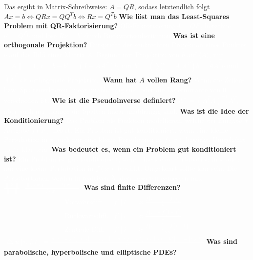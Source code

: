\documentclass{beamer}
\newcommand{\qr}{QR-Faktorisierung\xspace}
\begin{document}
{{{		Das ergibt in Matrix-Schreibweise: $A=QR$, sodass letztendlich folgt $Ax=b\Leftrightarrow QRx=QQ^Tb \Leftrightarrow Rx=Q^Tb$
} }
{\textbf{ Wie löst man das Least-Squares Problem mit \qr?\newline} \textcolor<1>{white}{
		\qr $A=QR$, berechne $b'=Q^Tb$ und löse $Rx=b'$ durch Rückwärtssubstitution
} }
{\textbf{ Was ist eine orthogonale Projektion?\newline} \textcolor<1>{white}{
		Entspricht der senkrechten Projektion eines Punktes $b$ auf das Bild einer Matrix $A$.
		Beginne mit Projektion von $b$ auf $\langle A\rangle$, mit $\|A\|=1$,
		$r=b-b'=(I-AA^T)b$, mit $b'=\left(\sum_{i=1}^{k}A_iA_i^T\right)b=\hat{A}\hat{A}^Tb$ und $\hat{A}\hat{A}^T$ als orthogonale Projektion.
} }
{\textbf{ Wann hat $A$ vollen Rang?\newline} \textcolor<1>{white}{
		Wenn die Zeilen- bzw. Spaltenvektoren linear unabhängig sind oder die Determinante von 0 verschieden ist.
} }
{\textbf{ Wie ist die Pseudoinverse definiert?\newline} \textcolor<1>{white}{
		$A^+=(A^TA)^{-1}A^T$, aber auch nur solange die Spalten linear unabhängig sind.
} }
{\textbf{ Was ist die Idee der Konditionierung?\newline} \textcolor<1>{white}{
		Das Problem als Funktion modellieren, welche bei Eingabe $x$ Ausgabe $f(x)$ liefert. Ein Problem ist gut konditioniert, wenn eine kleine Pertubation in $x$ auch nur eine kleine Pertubation in $f(x)$ bewirkt. Umgekehrt sollte klar sein. 
} }
{\textbf{ Was bedeutet es, wenn ein Problem gut konditioniert ist?\newline} \textcolor<1>{white}{
		Ein Problem ist gut konditioniert, wenn eine kleine Pertubation in $x$ auch nur eine kleine Pertubation in $f(x)$ bewirkt. Umgekehrt sollte klar sein. Die Pertubartionen werden in realtiven Änderungsraten gemessen mit:$\frac{\|\delta x\|}{\|x\|}, \; \frac{\|f(x+\delta x)-f(x)\|}{\|f(x)\|}$.
} }
{\textbf{ Was sind finite Differenzen?\newline} \textcolor<1>{white}{
		\begin{align*}
			\text{Vorwärtsdiff.} &f'[i]&\approx\frac{f[i+1]-f[i]}{h}\\
			\text{Rückwärtsdiff.}&f'[i]&\approx\frac{f[i]-f[i-1]}{h}\\
			\text{Zentrale Diff.}&f'[i]&\approx\frac{f[i+1]-f[i-1]}{2h}
		\end{align*}
		$\mathop{\!\mathbin\bigtriangleup} u[i,j,t]=\frac{u[i-1,j,t]+u[i+1,j,t]+u[i,j-1,t]+u[i,j+1.t]-4u[i,j,t]}{h^2}$
} }
{\textbf{ Was sind parabolische, hyperbolische und elliptische PDEs?\newline} \textcolor<1>{white}{
}}}
\end{document}
